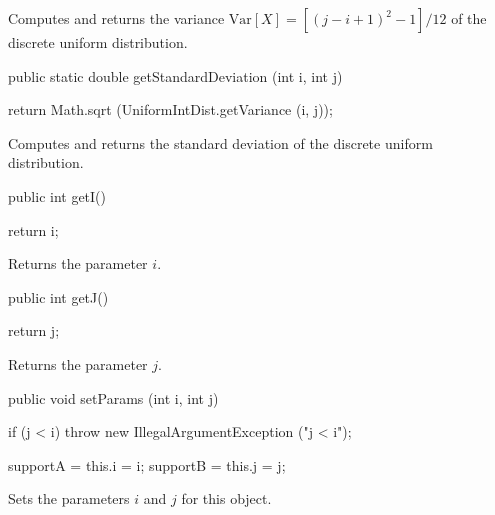 \begin{tabb}  Computes and returns the variance
   $\mbox{Var}[X] = [(j - i + 1)^2 - 1]/{12}$
   of the discrete uniform distribution.
\end{tabb}
\begin{htmlonly}
\end{htmlonly}
\begin{code}

   public static double getStandardDeviation (int i, int j)\begin{hide} {
      return Math.sqrt (UniformIntDist.getVariance (i, j));
   }\end{hide}
\end{code}
\begin{tabb}  Computes and returns the standard deviation
   of the discrete uniform distribution.
\end{tabb}
\begin{htmlonly}
\end{htmlonly}
\begin{code}

   public int getI()\begin{hide} {
      return i;
   }\end{hide}
\end{code}
  \begin{tabb}
  Returns the parameter $i$.
 \end{tabb}
\begin{code}

   public int getJ()\begin{hide} {
      return j;
   }\end{hide}
\end{code}
  \begin{tabb}
  Returns the parameter $j$.
 \end{tabb}
\begin{code}

   public void setParams (int i, int j)\begin{hide} {
      if (j < i)
        throw new IllegalArgumentException ("j < i");

      supportA = this.i = i;
      supportB = this.j = j;
   }\end{hide}
\end{code}
  \begin{tabb}
  Sets the parameters $i$ and $j$ for this object.
 \end{tabb}
